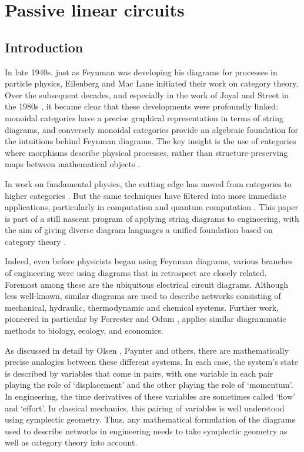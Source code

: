 \chapter{Passive linear circuits}


\section{Introduction}\label{sec:intro}
In late 1940s, just as Feynman was developing his diagrams for processes in particle physics, Eilenberg and Mac Lane initiated their work on category theory.  Over the subsequent decades, and especially in the work of Joyal and Street in the 1980s \cite{JS1,JS2}, it became clear that these developments were profoundly linked: monoidal categories have a precise graphical representation in terms of string diagrams, and conversely monoidal categories provide an algebraic foundation for the intuitions behind Feynman diagrams.  The key insight is the use of categories where morphisms describe physical processes, rather than structure-preserving maps between mathematical objects \cite{BaezStay,CP}.

In work on fundamental physics, the cutting edge has moved from categories
to higher categories \cite{BL}.  But the same techniques have filtered into more immediate applications, particularly in computation and quantum computation \cite{AC,Ba1,Se}.  This paper is part of a still nascent program of applying string diagrams to engineering, with the aim of giving diverse diagram languages a unified foundation based on category theory \cite{BE,BSZ,KSW,RSW,Sp}. 

Indeed, even before physicists began using Feynman diagrams, various branches of engineering were using diagrams that in retrospect are closely related.   Foremost among these are the ubiquitous electrical circuit diagrams. Although less well-known, similar diagrams are used to describe networks consisting of mechanical, hydraulic, thermodynamic and chemical systems.   Further work, pioneered in particular by 
Forrester \cite{Fo} and Odum \cite{Od}, applies similar diagrammatic methods to biology, ecology, and economics.

As discussed in detail by Olsen \cite{Ol}, Paynter \cite{Pa} and others, there are mathematically precise analogies between these different systems.  In each case, the system's state is described by variables that come in pairs, with one variable in each pair playing the role of  `displacement' and the other playing the role of `momentum'.  In engineering, the time derivatives of these variables are sometimes called `flow' and `effort'.    In classical mechanics, this pairing of variables is well understood using
symplectic geometry.  Thus, any mathematical formulation of the diagrams used to
describe networks in engineering needs to take symplectic geometry as well as category
theory into account. 

